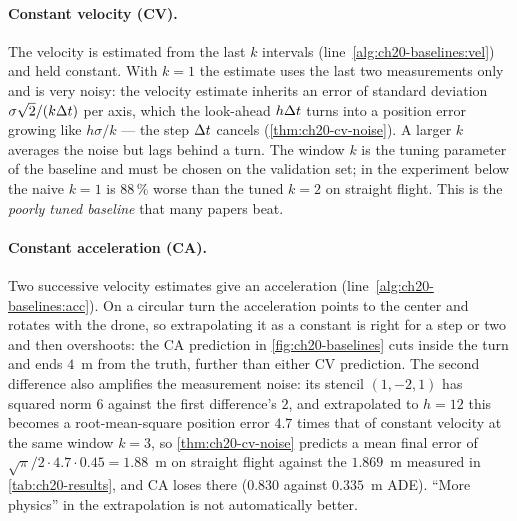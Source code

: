 \paragraph{Constant velocity (CV).}
%
The velocity is estimated from the last $k$ intervals
(line~\ref{alg:ch20-baselines:vel}) and held constant. With $k = 1$ the
estimate uses the last two measurements only and is very noisy: the velocity
estimate inherits an error of standard deviation $\sigma\sqrt{2}/(k\Delta t)$ per
axis, which the look-ahead $h\Delta t$ turns into a position error growing like
$h\sigma/k$ --- the step $\Delta t$ cancels (\cref{thm:ch20-cv-noise}). A larger $k$ averages the noise but lags behind
a turn. The window $k$ is the tuning parameter of the baseline and must be
chosen on the validation set; in the experiment below the naive $k = 1$ is
$88\,\%$ worse than the tuned $k = 2$ on straight flight. This is the
\emph{poorly tuned baseline} that many papers beat.

\paragraph{Constant acceleration (CA).}
%
Two successive velocity estimates give an acceleration
(line~\ref{alg:ch20-baselines:acc}). On a circular turn the acceleration
points to the center and rotates with the drone, so extrapolating it as a
constant is right for a step or two and then overshoots: the CA prediction
in \cref{fig:ch20-baselines} cuts inside the turn and ends $4$~m from the
truth, further than either CV prediction. The second difference also
amplifies the measurement noise: its stencil $(1, -2, 1)$ has squared norm
$6$ against the first difference's $2$, and extrapolated to $h = 12$ this
becomes a root-mean-square position error $4.7$ times that of constant
velocity at the same window $k = 3$, so \cref{thm:ch20-cv-noise} predicts a
mean final error of $\sqrt{\pi}/2 \cdot 4.7 \cdot 0.45 = 1.88$~m on straight
flight against the $1.869$~m measured in \cref{tab:ch20-results}, and CA
loses there ($0.830$ against $0.335$~m ADE). ``More physics'' in the
extrapolation is not automatically better.

